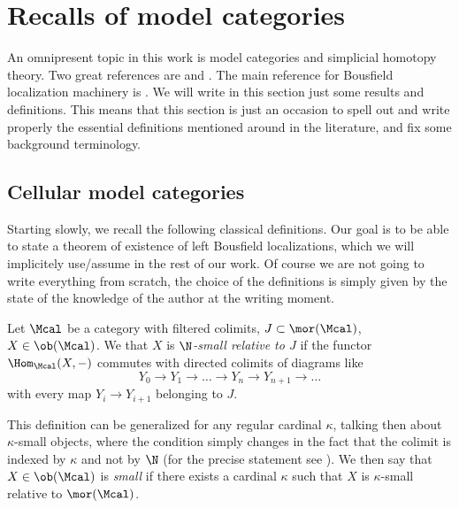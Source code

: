\chapter{Recalls of model categories}
    \label{chapter:model_categories}
    An omnipresent topic in this work is model categories and simplicial homotopy theory. Two great references are \cite{GoeJar:simpl_hom} and \cite{Hov:model}. The main reference for Bousfield localization machinery is \cite{Hirs:loc}.  We will write in this section just some results and definitions. This means that this section is just an occasion to spell out and write properly the essential definitions mentioned around in the literature, and fix some background terminology.
    \section{Cellular model categories}
        Starting slowly, we recall the following classical definitions. Our goal is to be able to state a theorem of existence of left Bousfield localizations, which we will implicitely use/assume in the rest of our work. Of course we are not going to write everything from scratch, the choice of the definitions is simply given by the state of the knowledge of the author at the writing moment.
        \begin{defn}
            \label{defn:hovey_small}
            Let $\Mcal$ be a category with filtered colimits, $J \subset \mor(\Mcal)$, $X \in \ob(\Mcal)$. We that $X$ is \emph{$\N$-small relative to $J$} if the functor $\Hom_{\Mcal}(X, -)$ commutes with directed colimits of diagrams like \[Y_0 \to Y_1 \to \dots \to Y_n \to Y_{n+1} \to \dots \] with every map $Y_i \to Y_{i+1}$ belonging to $J$.
        \end{defn}
        This definition can be generalized for any regular cardinal $\kappa$, talking then about $\kappa$-small objects, where the condition simply changes in the fact that the colimit is indexed by $\kappa$ and not by $\N$ (for the precise statement see \cite[Definition~2.1.3]{Hov:model}).
        We then say that $X \in \ob(\Mcal)$ is \emph{small} if there exists a cardinal $\kappa$ such that $X$ is $\kappa$-small relative to $\mor(\Mcal)$.

